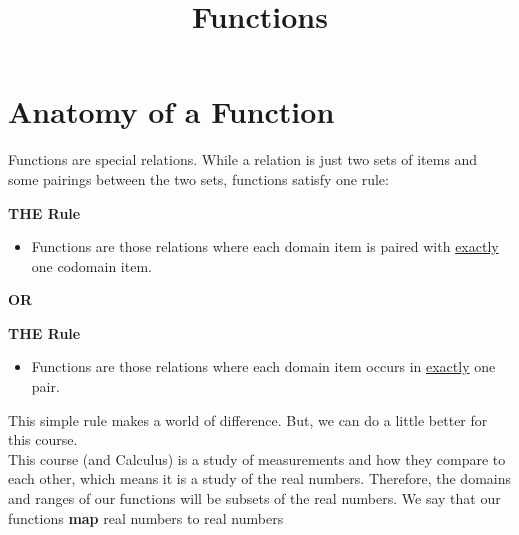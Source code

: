 \documentclass{ximera}
\title{Functions}
\begin{document}
\begin{abstract}
\end{abstract}
\maketitle





\section{Anatomy of a Function}


Functions are special relations. While a relation is just two sets of items and some pairings between the two sets, functions satisfy one rule: \\


\begin{condition} \textbf{\textcolor{purple!85!blue}{THE Rule}}  \\

\begin{itemize}
\item Functions are those relations where each domain item is paired with \underline{exactly} one codomain item.
\end{itemize}
\end{condition}


\begin{center}
\textbf{OR}
\end{center}


\begin{condition} \textbf{\textcolor{purple!85!blue}{THE Rule}} \\

\begin{itemize}
\item Functions are those relations where each domain item occurs in \underline{exactly} one pair.
\end{itemize}
\end{condition}




This simple rule makes a world of difference. But, we can do a little better for this course. \\




This course (and Calculus) is a study of measurements and how they compare to each other, which means it is a study of the real numbers.  Therefore, the domains and ranges of our functions will be subsets of the real numbers.  We say that our functions \textbf{map} real numbers to real numbers
\end{document}
